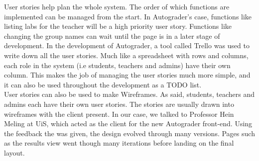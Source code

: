 User stories help plan the whole system. The order of which functions are implemented can be managed from the start. In Autograder's case, functions like listing labs for the teacher will be a high priority user story. Functions like changing the group names can wait until the page is in a later stage of development. In the development of Autograder, a tool called Trello  was used to write down all the user stories. Much like a spreadsheet with rows and columns, each role in the system (i.e students, teachers and admins) have their own column. This makes the job of managing the user stories much more simple, and it can also be used throughout the development as a TODO list.
\\User stories can also be used to make Wireframes. As said, students, teachers and admins each have their own user stories. The stories are usually drawn into wireframes with the client present. In our case, we talked to Professor Hein Meling at UiS, which acted as the client for the new Autograder front-end. Using the feedback the was given, the design evolved through many versions. Pages such as the results view  went though many iterations before landing on the final layout.




